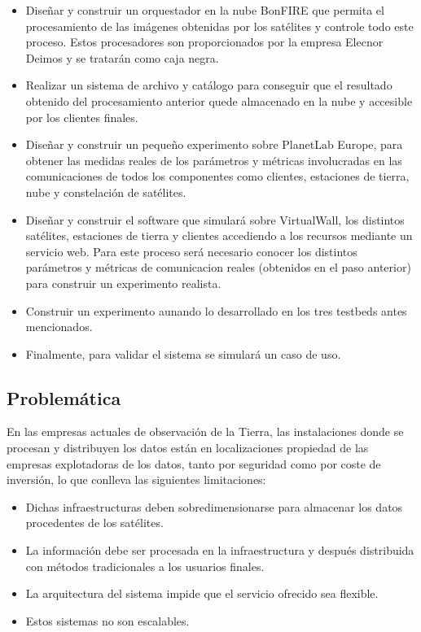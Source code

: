 \begin{itemize}
\item Diseñar y construir un orquestador en la nube BonFIRE que permita el procesamiento de las imágenes obtenidas por los satélites y controle todo este proceso. Estos procesadores son proporcionados por la empresa Elecnor Deimos y se tratarán como caja negra.

\item Realizar un sistema de archivo y catálogo para conseguir que el resultado obtenido del procesamiento anterior quede almacenado en la nube y accesible por los clientes finales.

\item Diseñar y construir un pequeño experimento sobre PlanetLab Europe, para obtener las medidas reales de los parámetros y métricas involucradas en las comunicaciones de todos los componentes como clientes, estaciones de tierra, nube y constelación de satélites.

\item Diseñar y construir el software que simulará sobre VirtualWall, los distintos satélites, estaciones de tierra y clientes accediendo a los recursos mediante un servicio web. Para este proceso será necesario  conocer los distintos parámetros y métricas de comunicacion reales (obtenidos en el paso anterior)  para construir un experimento realista.

\item Construir un experimento aunando lo desarrollado en los tres testbeds antes mencionados.

\item Finalmente, para validar el sistema se simulará un caso de uso.
\end{itemize}


\subsection{Problemática}
\label{sec:problematica}

En las empresas actuales de observación de la Tierra,  las instalaciones donde se procesan y distribuyen los datos están en localizaciones propiedad de las empresas explotadoras de los datos, tanto por seguridad como por coste de inversión, lo que conlleva las siguientes limitaciones:
\begin{itemize}
\item Dichas infraestructuras deben sobredimensionarse para almacenar los datos procedentes de los satélites.
\item La información debe ser procesada en la infraestructura y después distribuida con métodos tradicionales a los usuarios finales.
\item La arquitectura del sistema impide que el servicio ofrecido sea flexible.
\item Estos sistemas no son escalables.
\end{itemize}

